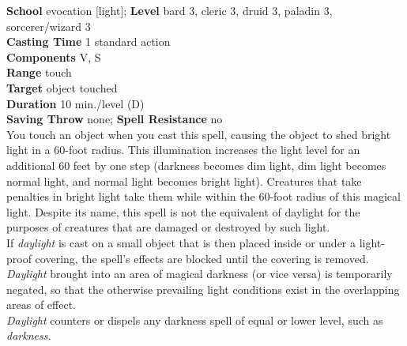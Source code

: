 \textbf{School} evocation [light]; \textbf{Level} bard 3, cleric 3, druid 3, paladin 3, sorcerer/wizard 3\\
\textbf{Casting Time} 1 standard action\\
\textbf{Components} V, S\\
\textbf{Range} touch\\
\textbf{Target} object touched\\
\textbf{Duration} 10 min./level (D)\\
\textbf{Saving Throw} none; \textbf{Spell Resistance} no\\
You touch an object when you cast this spell, causing the object to shed bright light in a 60-foot radius. This illumination increases the light level for an additional 60 feet by one step (darkness becomes dim light, dim light becomes normal light, and normal light becomes bright light). Creatures that take penalties in bright light take them while within the 60-foot radius of this magical light. Despite its name, this spell is not the equivalent of daylight for the purposes of creatures that are damaged or destroyed by such light.\\
If \textit{daylight }is cast on a small object that is then placed inside or under a light-proof covering, the spell's effects are blocked until the covering is removed.\\
\textit{Daylight }brought into an area of magical darkness (or vice versa) is temporarily negated, so that the otherwise prevailing light conditions exist in the overlapping areas of effect.\\
\textit{Daylight }counters or dispels any darkness spell of equal or lower level, such as \textit{darkness.}\\
